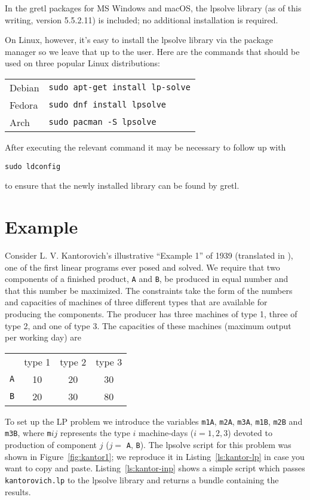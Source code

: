\documentclass{article}
\begin{document}
In the gretl packages for MS Windows and macOS, the \textsf{lpsolve}
library (as of this writing, version 5.5.2.11) is included; no
additional installation is required.

On Linux, however, it's easy to install the \textsf{lpsolve} library
via the package manager so we leave that up to the user. Here are the
commands that should be used on three popular Linux distributions:
\begin{center}
  \begin{tabular}{ll}
  Debian & \texttt{sudo apt-get install lp-solve} \\
  Fedora & \texttt{sudo dnf install lpsolve} \\
  Arch & \texttt{sudo pacman -S lpsolve}
\end{tabular}
\end{center}
After executing the relevant command it may be necessary to follow up
with
\begin{verbatim}
sudo ldconfig
\end{verbatim}
to ensure that the newly installed library can be found by gretl.

\section{Example}
\label{sec:example}

Consider L. V. Kantorovich's illustrative ``Example 1'' of 1939
(translated in \cite{kantorovich60}), one of the first linear programs
ever posed and solved. We require that two components of a finished
product, \texttt{A} and \texttt{B}, be produced in equal number and
that this number be maximized. The constraints take the form of the
numbers and capacities of machines of three different types that are
available for producing the components. The producer has three
machines of type 1, three of type 2, and one of type 3. The capacities
of these machines (maximum output per working day) are

\begin{center}
\begin{tabular}{cccc}
  & type 1 & type 2 & type 3 \\
  \texttt{A} & 10 & 20 & 30 \\
  \texttt{B} & 20 & 30 & 80 
\end{tabular}
\end{center}

To set up the LP problem we introduce the variables \texttt{m1A},
\texttt{m2A}, \texttt{m3A}, \texttt{m1B}, \texttt{m2B} and
\texttt{m3B}, where \texttt{m}$ij$ represents the type $i$
machine-days ($i=1,2,3$) devoted to production of component $j$ ($j=$
\texttt{A}, \texttt{B}).  The \textsf{lpsolve} script for this problem
was shown in Figure~\ref{fig:kantor1}; we reproduce it in
Listing~\ref{ls:kantor-lp} in case you want to copy and
paste. Listing~\ref{ls:kantor-inp} shows a simple script which passes
\texttt{kantorovich.lp} to the \textsf{lpsolve} library and returns a
bundle containing the results.
\end{document}

